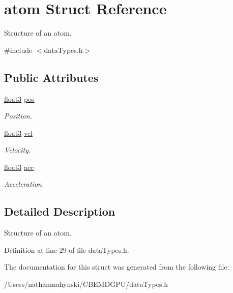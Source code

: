 \hypertarget{structatom}{\section{atom Struct Reference}
\label{structatom}
}


Structure of an atom.  




{\ttfamily \#include $<$data\-Types.\-h$>$}

\subsection*{Public Attributes}
\begin{DoxyCompactItemize}
\item 
\hypertarget{structatom_a6f304469ecac52a860f325ae6ac9ca34}{\hyperlink{structfloat3}{float3} \hyperlink{structatom_a6f304469ecac52a860f325ae6ac9ca34}{pos}}\label{structatom_a6f304469ecac52a860f325ae6ac9ca34}

\begin{DoxyCompactList}\small\item\em Position. \end{DoxyCompactList}\item 
\hypertarget{structatom_a010b2c50c7cdb6e4ec796e0c369e84d9}{\hyperlink{structfloat3}{float3} \hyperlink{structatom_a010b2c50c7cdb6e4ec796e0c369e84d9}{vel}}\label{structatom_a010b2c50c7cdb6e4ec796e0c369e84d9}

\begin{DoxyCompactList}\small\item\em Velocity. \end{DoxyCompactList}\item 
\hypertarget{structatom_a0d0e70ef3922064b59b805ac0f81d460}{\hyperlink{structfloat3}{float3} \hyperlink{structatom_a0d0e70ef3922064b59b805ac0f81d460}{acc}}\label{structatom_a0d0e70ef3922064b59b805ac0f81d460}

\begin{DoxyCompactList}\small\item\em Acceleration. \end{DoxyCompactList}\end{DoxyCompactItemize}


\subsection{Detailed Description}
Structure of an atom. 

Definition at line 29 of file data\-Types.\-h.



The documentation for this struct was generated from the following file\-:\begin{DoxyCompactItemize}
\item 
/\-Users/nathanmahynski/\-C\-B\-E\-M\-D\-G\-P\-U/data\-Types.\-h\end{DoxyCompactItemize}
